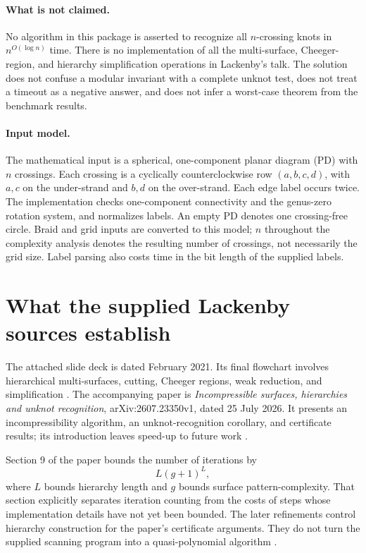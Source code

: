 \documentclass[11pt]{article}
\theoremstyle{remark}\newtheorem{remark}[theorem]{Remark}
\begin{document}
\paragraph{What is not claimed.}
No algorithm in this package is asserted to recognize all $n$-crossing knots
in $n^{O(\log n)}$ time. There is no implementation of all the multi-surface,
Cheeger-region, and hierarchy simplification operations in Lackenby's talk.
The solution does not confuse a modular invariant with a complete unknot
test, does not treat a timeout as a negative answer, and does not infer a
worst-case theorem from the benchmark results.

\paragraph{Input model.}
The mathematical input is a spherical, one-component planar diagram (PD)
with $n$ crossings. Each crossing is a cyclically counterclockwise row
$(a,b,c,d)$, with $a,c$ on the under-strand and $b,d$ on the over-strand.
Each edge label occurs twice. The implementation checks one-component
connectivity and the genus-zero rotation system, and normalizes labels.
An empty PD denotes one crossing-free circle. Braid and grid inputs are
converted to this model; $n$ throughout the complexity analysis denotes
the resulting number of crossings, not necessarily the grid size.
Label parsing also costs time in the bit length of the supplied labels.

\section{What the supplied Lackenby sources establish}
The attached slide deck is dated February 2021. Its final flowchart involves
hierarchical multi-surfaces, cutting, Cheeger regions, weak reduction, and
simplification \cite{LackenbyTalk}. The accompanying paper is
\emph{Incompressible surfaces, hierarchies and unknot recognition},
arXiv:2607.23350v1, dated 25 July 2026. It presents an incompressibility
algorithm, an unknot-recognition corollary, and certificate results; its
introduction leaves speed-up to future work \cite{Lackenby2026}.

Section 9 of the paper bounds the number of iterations by
\begin{equation}\label{eq:hierarchy}
                 L(g+1)^L,
\end{equation}
where $L$ bounds hierarchy length and $g$ bounds surface pattern-complexity.
That section explicitly separates iteration counting from the costs of
steps whose implementation details have not yet been bounded.
The later refinements control hierarchy construction for the paper's
certificate arguments. They do not turn the supplied scanning program
into a quasi-polynomial algorithm \cite{Lackenby2026}.
\end{document}
